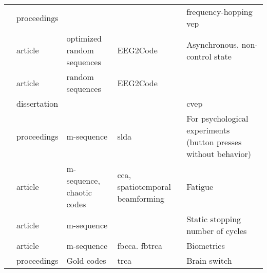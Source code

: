 \documentclass[a4paper,landscape]{article}
\begin{document}
\begin{table}[H]
\begin{tabular}{p{5cm}p{2cm}p{5cm}p{5cm}p{6.5cm}}
		\citeauthor{matsuno2019} & proceedings & & & frequency-hopping \acrshort{vep} \\
		\citeauthor{nagel2019a} & article & optimized random sequences & EEG2Code & Asynchronous, non-control state \\
		\citeauthor{nagel2019b} & article & random sequences & EEG2Code & \\
		\citeauthor{nagel2019c} & dissertation & & & \acrshort{cvep} \\
		\citeauthor{peng2019} & proceedings & m-sequence & \acrshort{slda} & For psychological experiments (button presses without behavior) \\
		\citeauthor{shirzhiyan2019} & article & m-sequence, chaotic codes & \acrshort{cca}, spatiotemporal beamforming & Fatigue \\
		\citeauthor{turi2019} & article & m-sequence & & Static stopping number of cycles \\
		\citeauthor{zhao2019} & article & m-sequence & \acrshort{fbcca}. \acrshort{fbtrca} & Biometrics \\
		\citeauthor{zheng2019} & proceedings & Gold codes & \acrshort{trca} & Brain switch \\
		\bottomrule
	\end{tabular}
\end{table}
\end{document}
